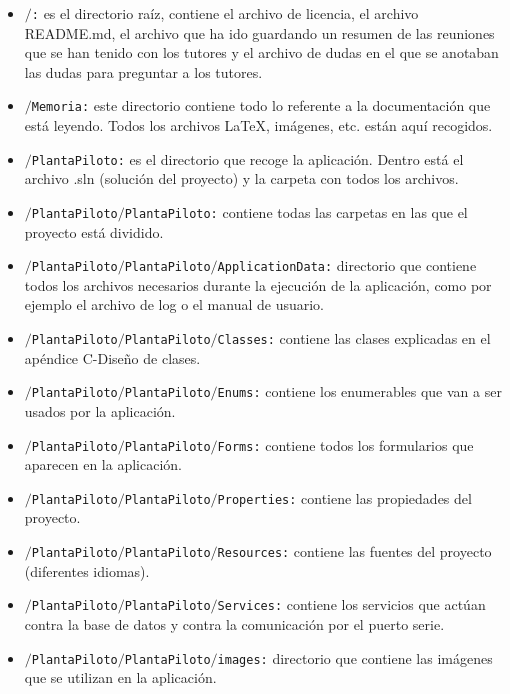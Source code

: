 \begin{itemize}
	\item \texttt{$\slash$:} es el directorio raíz, contiene el archivo de licencia, el archivo README.md, el archivo que ha ido guardando un resumen de las reuniones que se han tenido con los tutores y el archivo de dudas en el que se anotaban las dudas para preguntar a los tutores.
	\item \texttt{$\slash$Memoria:} este directorio contiene todo lo referente a la documentación que está leyendo. Todos los archivos \LaTeX, imágenes, etc. están aquí recogidos.
	\item \texttt{$\slash$PlantaPiloto:} es el directorio que recoge la aplicación. Dentro está el archivo .sln (solución del proyecto) y la carpeta con todos los archivos.
	\item \texttt{$\slash$PlantaPiloto$\slash$PlantaPiloto:} contiene todas las carpetas en las que el proyecto está dividido.
	\item \texttt{$\slash$PlantaPiloto$\slash$PlantaPiloto$\slash$ApplicationData:} directorio que contiene todos los archivos necesarios durante la ejecución de la aplicación, como por ejemplo el archivo de log o el manual de usuario.
	\item \texttt{$\slash$PlantaPiloto$\slash$PlantaPiloto$\slash$Classes:} contiene las clases explicadas en el apéndice C-Diseño de clases.
	\item \texttt{$\slash$PlantaPiloto$\slash$PlantaPiloto$\slash$Enums:} contiene los enumerables que van a ser usados por la aplicación.
	\item \texttt{$\slash$PlantaPiloto$\slash$PlantaPiloto$\slash$Forms:} contiene todos los formularios que aparecen en la aplicación.
	\item \texttt{$\slash$PlantaPiloto$\slash$PlantaPiloto$\slash$Properties:} contiene las propiedades del proyecto.
	\item \texttt{$\slash$PlantaPiloto$\slash$PlantaPiloto$\slash$Resources:} contiene las fuentes del proyecto (diferentes idiomas).
	\item \texttt{$\slash$PlantaPiloto$\slash$PlantaPiloto$\slash$Services:} contiene los servicios que actúan contra la base de datos y contra la comunicación por el puerto serie.
	\item \texttt{$\slash$PlantaPiloto$\slash$PlantaPiloto$\slash$images:} directorio que contiene las imágenes que se utilizan en la aplicación.
	
\end{itemize}

